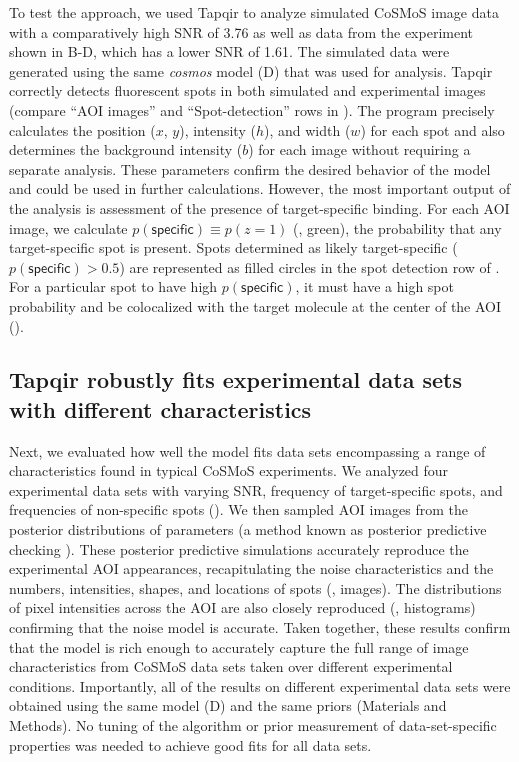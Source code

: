 To test the approach, we used Tapqir to analyze simulated CoSMoS image data with a comparatively high SNR of 3.76 as well as data from the experiment shown in B-D, which has a lower SNR of 1.61. The simulated data were generated using the same \emph{cosmos} model (D) that was used for analysis. Tapqir correctly detects fluorescent spots in both simulated and experimental images (compare ``AOI images'' and ``Spot-detection'' rows in ). The program precisely calculates the position ($x$, $y$), intensity ($h$), and width ($w$) for each spot and also determines the background intensity ($b$) for each image without requiring a separate analysis. These parameters confirm the desired behavior of the model and could be used in further calculations.  However, the most important output of the analysis is assessment of the presence of target-specific binding.  For each AOI image, we calculate $p(\mathsf{specific}) \equiv p(z=1)$ (, green), the probability that any target-specific spot is present. Spots determined as likely target-specific ($p(\mathsf{specific}) > 0.5$) are represented as filled circles in the spot detection row of . For a particular spot to have high $p(\mathsf{specific})$, it must have a high spot probability and be colocalized with the target molecule at the center of the AOI ().  



\subsection{Tapqir robustly fits experimental data sets with different characteristics}

Next, we evaluated how well the model fits data sets encompassing a range of characteristics found in typical CoSMoS experiments. We analyzed four experimental data sets with varying SNR, frequency of target-specific spots, and frequencies of non-specific spots (). We then sampled AOI images from the posterior distributions of parameters (a method known as posterior predictive checking \citep{Gelman2013-ro}). These posterior predictive simulations accurately reproduce the experimental AOI appearances, recapitulating the noise characteristics and the numbers, intensities, shapes, and locations of spots (, images).  The distributions of pixel intensities across the AOI are also closely reproduced (, histograms) confirming that the noise model is accurate. Taken together, these results confirm that the model is rich enough to accurately capture the full range of image characteristics from CoSMoS data sets taken over different experimental conditions.  Importantly, all of the results on different experimental data sets were obtained using the same model (D) and the same priors (Materials and Methods).  No tuning of the algorithm or prior measurement of data-set-specific properties was needed to achieve good fits for all data sets.


